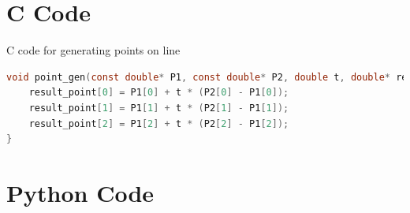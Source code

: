\documentclass{beamer}
\theoremstyle{remark}
\numberwithin{equation}{section}
\begin{document}
\section{C Code}
\begin{frame}[fragile]{C code for generating points on line}
\begin{lstlisting}[language=C]
 void point_gen(const double* P1, const double* P2, double t, double* result_point) {
    result_point[0] = P1[0] + t * (P2[0] - P1[0]);
    result_point[1] = P1[1] + t * (P2[1] - P1[1]);
    result_point[2] = P1[2] + t * (P2[2] - P1[2]);
}
\end{lstlisting}
\end{frame}

\section{Python Code}
\end{document}
